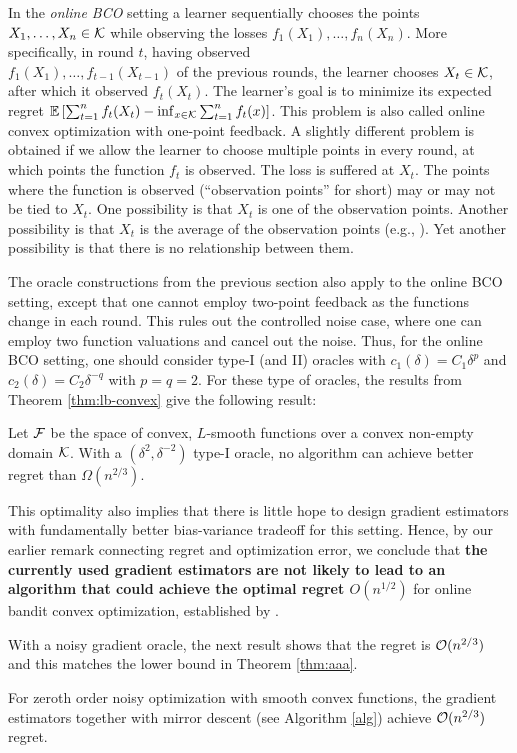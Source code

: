 In the \emph{online BCO} setting a learner sequentially chooses the points $X_1,\dots,X_n\in \mathcal{K}$ while observing the losses $f_1(X_1),\dots,f_n(X_n)$. More specifically, in round $t$, having observed\\ $f_1(X_1),\dots,f_{t-1}(X_{t-1})$ of the previous rounds, the learner chooses $X_t\in \mathcal{K}$, after which it observed $f_t(X_t)$. The learner's goal is to minimize its expected regret $\mathbb{E}\left[ \sum_{t=1}^n f_t(X_t) - \inf_{x\in \mathcal{K}} \sum_{t=1}^n f_t(x) \right]$. 
This problem is also called online convex optimization with one-point feedback.
A slightly different problem is obtained if we allow the learner to choose multiple points in every round, at which points the function $f_t$ is observed. The loss is suffered at $X_t$. The points where the function is observed (``observation points'' for short) may or may not be tied to $X_t$. One possibility is that $X_t$ is one of the observation points.  
Another possibility is that $X_t$ is the average of the observation points (e.g., \citealt{AgDeXi10}). Yet another possibility is that there is no relationship between them. 

The oracle constructions from the previous section also apply to the online BCO setting, except that one cannot employ two-point feedback as the functions change in each round.  
This rules out the controlled noise case, where one can employ two function valuations and cancel out the noise. Thus, for the online BCO setting, one should consider type-I (and II) oracles with $c_1(\delta) = C_1 \delta^p$ and $c_2(\delta) = C_2\delta^{-q}$ with $p=q=2$.
For these type of oracles, the results from Theorem \ref{thm:lb-convex} give the following result: 
\begin{theorem}\label{thm:aaa}
Let $\mathcal{F}$ be the space of convex, $L$-smooth functions over a convex non-empty domain $\mathcal{K}$.
With a 
$(\delta^2,\delta^{-2})$ type-I oracle, no algorithm can achieve better regret than $\Omega(n^{2/3})$.
\end{theorem}

This optimality also implies that there is little hope to design gradient estimators with fundamentally better bias-variance tradeoff for this setting. Hence, by our earlier remark connecting regret and optimization error, we conclude that
 \textbf{
the currently used gradient estimators are not likely to lead to an algorithm that could  achieve the optimal
regret $O(n^{1/2})$} for online bandit convex optimization, established by \citet{BubeckDKP15,BuEl15}.

With a noisy gradient oracle, the next result shows that the regret is  $\mathcal{O}(n^{2/3})$ and this matches the lower bound in Theorem \ref{thm:aaa}.
\begin{theorem}
For zeroth order noisy optimization with smooth convex functions, the gradient estimators together with mirror descent (see Algorithm \ref{alg}) achieve $\mathcal{O}(n^{2/3})$ regret. \end{theorem}




